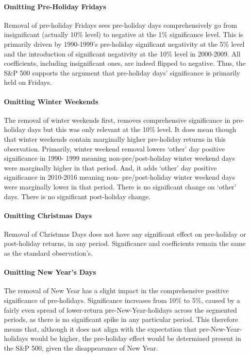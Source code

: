\documentclass[11pt, english]{article}
\begin{document}
			\paragraph{Omitting Pre-Holiday Fridays}

			Removal of pre-holiday Fridays sees pre-holiday days comprehensively go from insignificant (actually 10\% level) to negative at the 1\% significance level. This is primarily driven by 1990-1999’s pre-holiday significant negativity at the 5\% level and the introduction of significant negativity at the 10\% level in 2000-2009. All coefficients, including insignificant ones, are indeed flipped to negative. Thus, the S\&P 500 supports the argument that pre-holiday days’ significance is primarily held on Fridays.

			\paragraph{Omitting Winter Weekends}

			The removal of winter weekends first, removes comprehensive significance in pre- holiday days but this was only relevant at the 10\% level. It does mean though that winter weekends contain marginally higher pre-holiday returns in this observation. Primarily, winter weekend removal lowers `other' day positive significance in 1990- 1999 meaning non-pre/post-holiday winter weekend days were marginally higher in that period. And, it adds `other' day positive significance in 2010-2016 meaning non- pre/post-holiday winter weekend days were marginally lower in that period. There is no significant change on `other’ days. There is no significant post-holiday change.

			\paragraph{Omitting Christmas Days}

			Removal of Christmas Days does not have any significant effect on pre-holiday or post-holiday returns, in any period. Significance and coefficients remain the same as the standard observation’s.

			\paragraph{Omitting New Year’s Days}

			The removal of New Year has a slight impact in the comprehensive positive significance of pre-holidays. Significance increases from 10\% to 5\%, caused by a fairly even spread of lower-return pre-New-Year-holidays across the segmented periods, as there is no significant spike in any particular period. This therefore means that, although it does not align with the expectation that pre-New-Year-holidays would be higher, the pre-holiday effect would be determined present in the S\&P 500, given the disappearance of New Year.
\end{document}
